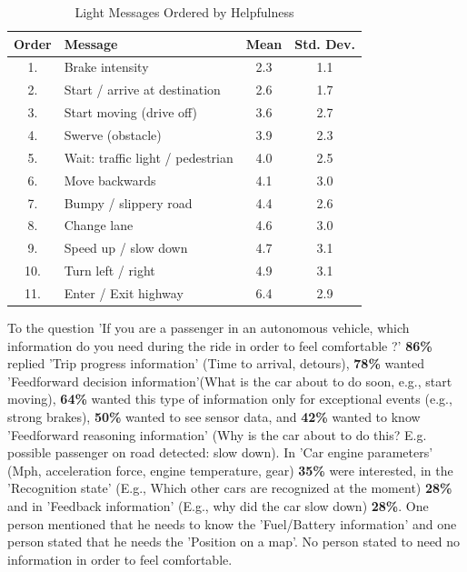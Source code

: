 \begin{table}
  \caption{Light Messages Ordered by Helpfulness}
  \label{tab:order}
  \begin{tabular}[t]{clcc}
    \toprule
    Order & Message & Mean & Std. Dev.\\
    \midrule
1.  & Brake intensity                     & 2.3 & 1.1 \\
2.  & Start / arrive  at destination       & 2.6 & 1.7 \\
3.  & Start moving (drive off)            & 3.6 & 2.7 \\
4.  & Swerve (obstacle)                   & 3.9 & 2.3 \\
5.  & Wait: traffic light / pedestrian & 4.0 & 2.5 \\
6.  & Move backwards                      & 4.1 & 3.0 \\
7.  & Bumpy  / slippery road               & 4.4 & 2.6 \\
8.  & Change lane                         & 4.6 & 3.0 \\
9.  & Speed up / slow down                & 4.7 & 3.1 \\
10. & Turn left / right                   & 4.9 & 3.1 \\
11. & Enter / Exit highway                & 6.4 & 2.9
\end{tabular}
\end{table}

To the question 'If you are a passenger in an autonomous vehicle, which information do you need during the ride in order to feel comfortable ?' 
\textbf{86\%} replied 'Trip progress information' (Time to arrival, detours), \textbf{78\%} wanted 'Feedforward decision information'(What is the car about to do soon, e.g., start moving), \textbf{64\%} wanted this type of information only for exceptional events (e.g., strong brakes), \textbf{50\%} wanted to see sensor data, and \textbf{42\%} wanted to know 'Feedforward reasoning information' (Why is the car about to do this? E.g. possible passenger on road detected: slow down). In 'Car engine parameters' (Mph, acceleration force, engine temperature, gear) \textbf{35\%} were interested, in the 'Recognition state' (E.g., Which other cars are recognized at the moment) \textbf{28\%} and in 'Feedback information' (E.g., why did the car slow down) \textbf{28\%}. One person mentioned that he needs to know the 'Fuel/Battery information' and one person stated that he needs the 'Position on a map'. No person stated to need no information in order to feel comfortable. 

